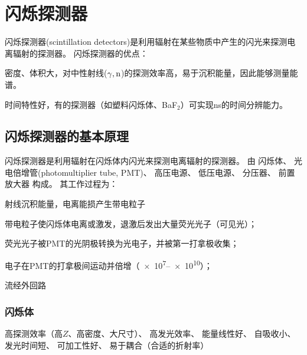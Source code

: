 \chapter{闪烁探测器}

闪烁探测器(scintillation detectors)是利用辐射在某些物质中产生的闪光来探测电离辐射的探测器。
闪烁探测器的优点：
\begin{compactenum}
	\item 密度、体积大，对中性射线($\gamma,\mathrm n$)的探测效率高，易于沉积能量，因此能够测量能谱。
	\item 时间特性好，有的探测器（如塑料闪烁体、BaF$_2$）可实现ns的时间分辨能力。
\end{compactenum}

\section{闪烁探测器的基本原理}

闪烁探测器是利用辐射在闪烁体内闪光来探测电离辐射的探测器。
由
闪烁体、
光电倍增管(photomultiplier tube, PMT)、
高压电源、
低压电源、
分压器、
前置放大器
构成。
其工作过程为：
\begin{compactenum}
	\item 射线沉积能量，电离能损产生带电粒子
	\item 带电粒子使闪烁体电离或激发，退激后发出大量荧光光子（可见光）；
	\item 荧光光子被PMT的光阴极转换为光电子，并被第一打拿极收集；
	\item 电子在PMT的打拿极间运动并倍增（\numrange{e7}{e10}）；
	\item 流经外回路
\end{compactenum}

\subsection{闪烁体}

高探测效率（高$Z$、高密度、大尺寸）、
高发光效率、
能量线性好、
自吸收小、
发光时间短、
可加工性好、
易于耦合（合适的折射率）
